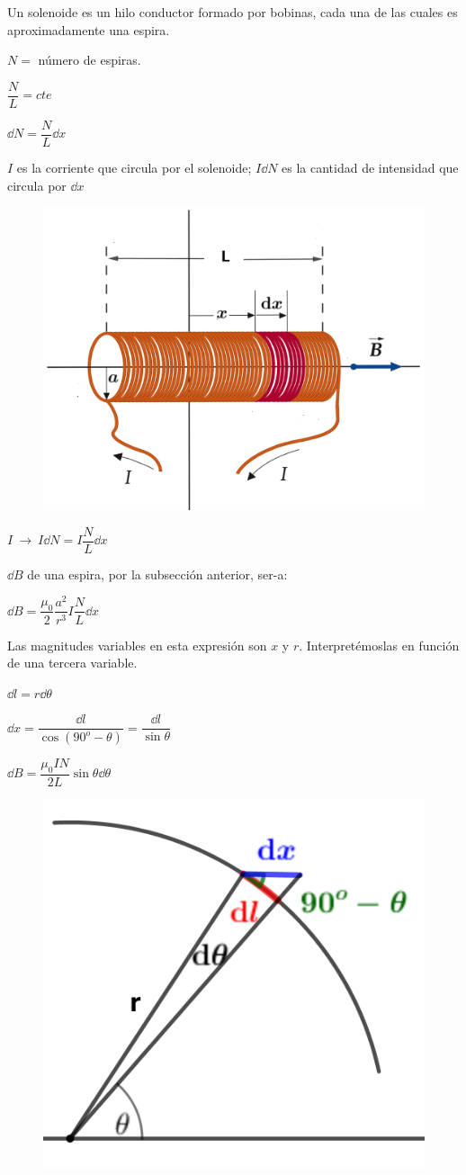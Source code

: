 Un solenoide es un hilo conductor formado por bobinas, cada una de las cuales es aproximadamente una espira.

\begin{multicols}{2}
$N=$ número de espiras.

$\dfrac N L = cte$

$\dd N=\dfrac N L \dd x$

$I$ es la corriente que circula por el solenoide; $I\dd N$ es la cantidad de intensidad que circula por $\dd x$
\begin{figure}[H]
	\centering
	\includegraphics[width=.55\textwidth]{imagenes/imagenes26/T26IM09.png}
	\end{figure}	
\end{multicols}

$ I \ \to \ I \dd N=I\dfrac N L \dd x$

$\dd B$ de una espira, por la subsección anterior, ser-a:

$\dd B=\dfrac{\mu_0}{2} \dfrac{a^2}{r^3} I \dfrac N L \dd x$

Las magnitudes variables en esta expresión son $x$ y $r$. Interpretémoslas en función de una tercera variable.

\begin{multicols}{2}
$\dd l=r \dd \theta$

$\dd x=\dfrac {\dd l}{\cos(90^o-\theta)}=\dfrac {\dd l}{\sin \theta}$

$\dd B=\dfrac {\mu_0 I N}{2L} \sin \theta \dd \theta$ 
\begin{figure}[H]
	\centering
	\includegraphics[width=.3\textwidth]{imagenes/imagenes26/T26IM10.png}
	\end{figure}	
\end{multicols}

